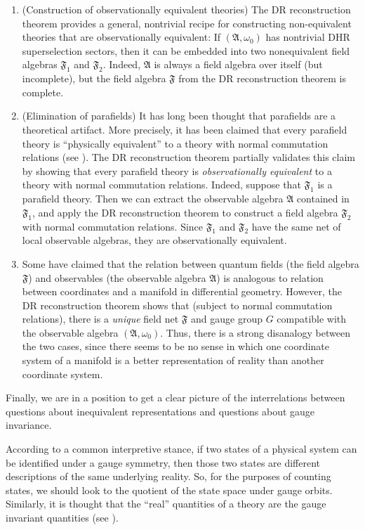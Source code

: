 \documentclass[11pt]{article}
\newcommand{\alg}[1]{\mathfrak{#1}}
\theoremstyle{definition}
\theoremstyle{definition}
\theoremstyle{remark}
\def\al#1{{\mathfrak #1}}
\def\om{\omega} \def\Om{\Omega} \def\dd{\partial} \def\D{\Delta}
\begin{document}
\begin{enumerate}
\item (Construction of observationally equivalent theories) The DR
  reconstruction theorem provides a general, nontrivial recipe for
  constructing non-equivalent theories that are observationally
  equivalent: If $(\alg{A},\om _0)$ has nontrivial DHR superselection
  sectors, then it can be embedded into two nonequivalent field
  algebras $\alg{F}_1$ and $\alg{F}_2$.  Indeed, $\alg{A}$ is always a
  field algebra over itself (but incomplete), but the field algebra
  $\alg{F}$ from the DR reconstruction theorem is complete.
  \item (Elimination of parafields) It has long been thought that
  parafields are a theoretical artifact.  More precisely, it has been
  claimed that every parafield theory is ``physically equivalent'' to
  a theory with normal commutation relations (see \cite{araki-para}).
  The DR reconstruction theorem partially validates this claim by
  showing that every parafield theory is \emph{observationally
    equivalent} to a theory with normal commutation relations.
  Indeed, suppose that $\alg{F}_1$ is a parafield theory.  Then we can
  extract the observable algebra $\alg{A}$ contained in $\alg{F}_1$,
  and apply the DR reconstruction theorem to construct a field algebra
  $\alg{F}_2$ with normal commutation relations.  Since $\alg{F}_1$
  and $\alg{F}_2$ have the same net of local observable algebras, they
  are observationally equivalent.
\item \noindent Some have claimed that the relation between quantum
  fields (the field algebra $\al F$) and observables (the observable
  algebra $\al A$) is analogous to relation between coordinates and a
  manifold in differential geometry.  However, the DR reconstruction
  theorem shows that (subject to normal commutation relations), there
  is a \emph{unique} field net $\alg{F}$ and gauge group $G$
  compatible with the observable algebra $(\alg{A},\om _0)$.  Thus,
  there is a strong disanalogy between the two cases, since there
  seems to be no sense in which one coordinate system of a manifold is
  a better representation of reality than another coordinate system.
\end{enumerate}

Finally, we are in a position to get a clear picture of the
interrelations between questions about inequivalent representations
and questions about gauge invariance.

According to a common interpretive stance, if two states of a physical
system can be identified under a gauge symmetry, then those two states
are different descriptions of the same underlying reality.  So, for
the purposes of counting states, we should look to the quotient of the
state space under gauge orbits.  Similarly, it is thought that the
``real'' quantities of a theory are the gauge invariant quantities
(see \cite{ear}).
\end{document}
